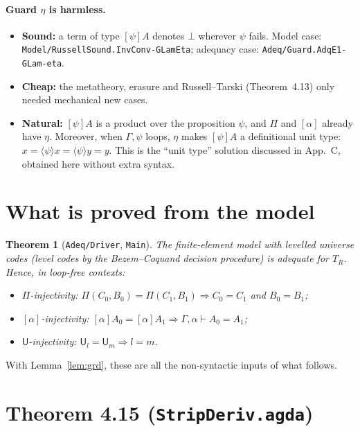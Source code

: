\documentclass[10pt]{article}
\newcommand{\U}{\mathsf{U}}
\newcommand{\TR}{T_R}
\newcommand{\grd}[2]{[#1]#2}
\newcommand{\glam}[2]{\langle #1\rangle #2}
\newcommand{\lpi}[1]{[\alpha]#1}
\newcommand{\agda}[1]{\texttt{#1}}
\newtheorem{theorem}{Theorem}
\theoremstyle{remark}
\begin{document}
\paragraph{Guard $\eta$ is harmless.}
\begin{itemize}
\item \textbf{Sound:} a term of type $\grd\psi A$ denotes $\bot$ wherever
  $\psi$ fails.  Model case: \agda{Model/RussellSound.InvConv-GLamEta};
  adequacy case: \agda{Adeq/Guard.AdqE1-GLam-eta}.
\item \textbf{Cheap:} the metatheory, erasure and Russell--Tarski
  (Theorem~4.13) only needed mechanical new cases.
\item \textbf{Natural:} $\grd\psi A$ is a product over the proposition
  $\psi$, and $\Pi$ and $[\alpha]$ already have $\eta$.  Moreover, when
  $\Gamma,\psi$ loops, $\eta$ makes $\grd\psi A$ a definitional unit type:
  $x=\glam\psi x=\glam\psi y=y$.  This is the ``unit type'' solution
  discussed in App.~C, obtained here without extra syntax.
\end{itemize}

\section{What is proved from the model}

\begin{theorem}[\agda{Adeq/Driver}, \agda{Main}]
The finite-element model with levelled universe codes (level codes by the
Bezem--Coquand decision procedure) is adequate for $\TR$.  Hence, in
loop-free contexts:
\begin{itemize}
\item $\Pi$-injectivity: $\Pi(C_0,B_0)=\Pi(C_1,B_1)\Rightarrow C_0=C_1$ and
  $B_0=B_1$;
\item $[\alpha]$-injectivity: $\lpi{A_0}=\lpi{A_1}\Rightarrow\Gamma,\alpha\vdash A_0=A_1$;
\item $\U$-injectivity: $\U_l=\U_m\Rightarrow l=m$.
\end{itemize}
\end{theorem}
\noindent
With Lemma~\ref{lem:grd}, these are all the non-syntactic inputs of what follows.

\section{Theorem 4.15 (\agda{StripDeriv.agda})}
\end{document}
